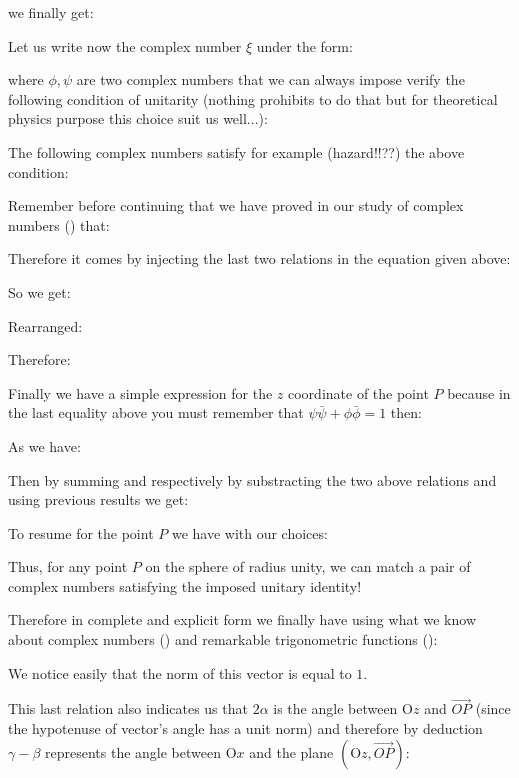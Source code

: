 	we finally get:
	
	Let us write now the complex number $\xi$ under the form:
	
	
	 where $\phi,\psi$ are two complex numbers that we can always impose verify the following condition of unitarity (nothing prohibits to do that but for theoretical physics purpose this choice suit us well...):
	
	\begin{tcolorbox}[title=Remark,colframe=black,arc=10pt]
		The following complex numbers satisfy for example (hazard!!??)  the above condition:
		
	\end{tcolorbox}	
	Remember before continuing that we have proved in our study of complex numbers () that:
	
	Therefore it comes by injecting the last two relations in the equation given above:
	
	So we get:
	
	Rearranged:
	
	Therefore:
	
	Finally we have a simple expression for the $z$ coordinate of the point $P$ because in the last equality above you must remember that $\psi\bar{\psi}+\phi\bar{\phi}=1$ then:
	
	As we have:
	
	Then by summing and respectively by substracting the two above relations and using previous results we get:
	
	To resume for the point $P$ we have with our choices:
	
	Thus, for any point $P$ on the sphere of radius unity, we can match a pair of complex numbers satisfying the imposed unitary identity!
	
	\pagebreak
	Therefore in complete and explicit form we finally have using what we know about complex numbers () and remarkable trigonometric functions ():
	
	We notice easily that the norm of this vector is equal to $1$.
	
	This last relation also indicates us that $2\alpha$ is the angle between $\text{O}z$ and $\overrightarrow{OP}$ (since the hypotenuse of vector's angle has a unit norm) and therefore by deduction $\gamma-\beta$ represents the angle between $\text{O}x$ and the plane $(\text{O}z, \overrightarrow{OP})$:
	
